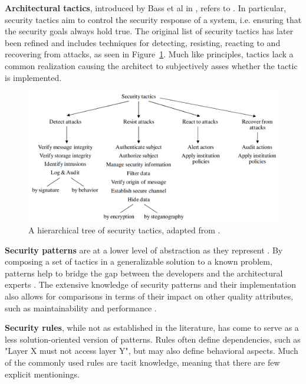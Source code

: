 \textbf{Architectural tactics}, introduced by Bass et al in \cite{bass_software_2003}, refers to . In particular, security tactics aim to control the security response of a system, i.e. ensuring that the security goals always hold true. The original list of security tactics has later been refined \cite{ryoo_revising_2012,fernandez_revisiting_2015} and includes techniques for detecting, resisting, reacting to and recovering from attacks, as seen in Figure~\ref{fig:security_tactics}. Much like principles, tactics lack a common realization causing the architect to subjectively asses whether the tactic is implemented.

\begin{figure}
    \centering
    \captionsetup{justification=centering}
    \includegraphics[width=\textwidth]{figure/securityTactics.png}
    \caption{A hierarchical tree of security tactics, adapted from \cite{fernandez_revisiting_2015}.}
    \label{fig:security_tactics}
\end{figure}

\textbf{Security patterns} are at a lower level of abstraction as they represent  \cite{fernandez-buglioni_security_2013}. By composing a set of tactics in a generalizable solution to a known problem, patterns help to bridge the gap between the developers and the architectural experts \cite{rosado_study_2006}. The extensive knowledge of security patterns and their implementation also allows for comparisons in terms of their impact on other quality attributes, such as maintainability and performance \cite{scandariato_architecting_2009}. 

\textbf{Security rules}, while not as established in the literature, has come to serve as a less solution-oriented version of patterns. Rules often define dependencies, such as "Layer X must not access layer Y", but may also define behavioral aspects. Much of the commonly used rules are tacit knowledge, meaning that there are few explicit mentionings. 

